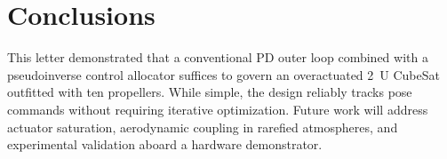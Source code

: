 \documentclass[journal]{IEEEtran}
\begin{document}
\section{Conclusions}
This letter demonstrated that a conventional PD outer loop combined with a pseudoinverse control allocator suffices to govern an overactuated \qty{2}{U} CubeSat outfitted with ten propellers. While simple, the design reliably tracks pose commands without requiring iterative optimization. Future work will address actuator saturation, aerodynamic coupling in rarefied atmospheres, and experimental validation aboard a hardware demonstrator.



\end{document}
